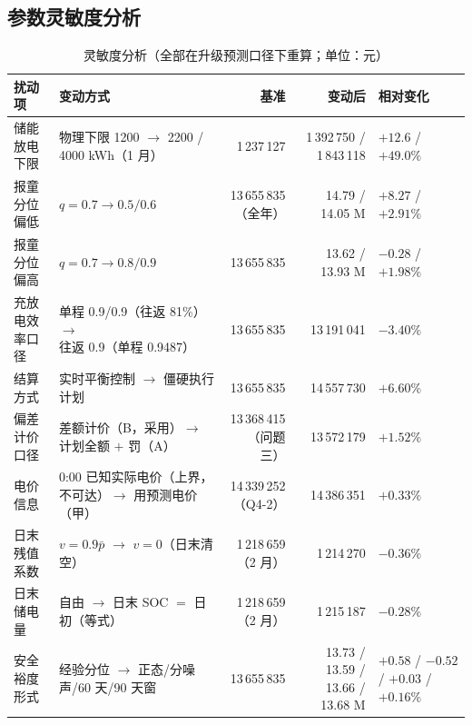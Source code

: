 \subsection{参数灵敏度分析}

\begin{table}[htbp]
\centering
\caption{灵敏度分析（全部在升级预测口径下重算\nobreak；单位\nobreak：元\nobreak）}
\label{tab:sens}
\begin{tabularx}{\textwidth}{@{}p{2.3cm}p{2.9cm}rRL@{}}
\toprule
扰动项 & 变动方式 & 基准 & 变动后 & 相对变化 \\
\midrule
储能放电下限 & 物理下限 1200 $\to$ 2200 / 4000 kWh（1 月\nobreak） & 1\,237\,127 & 1\,392\,750 / 1\,843\,118 & $+12.6$ / $+49.0\text{\%}$ \\
报童分位偏低 & $q=0.7\to0.5/0.6$ & 13\,655\,835（全年\nobreak） & 14.79 / 14.05 M & $+8.27$ / $+2.91\text{\%}$ \\
报童分位偏高 & $q=0.7\to0.8/0.9$ & 13\,655\,835 & 13.62 / 13.93 M & $-0.28$ / $+1.98\text{\%}$ \\
充放电效率口径 & 单程 0.9/0.9（往返 81\%\nobreak）$\to$ 往返 0.9（单程 0.9487\nobreak） & 13\,655\,835 & 13\,191\,041 & $-3.40\text{\%}$ \\
结算方式 & 实时平衡控制 $\to$ 僵硬执行计划 & 13\,655\,835 & 14\,557\,730 & $+6.60\text{\%}$ \\
偏差计价口径 & 差额计价（B\nobreak，采用\nobreak）$\to$ 计划全额 $+$ 罚（A\nobreak） & 13\,368\,415（问题三\nobreak） & 13\,572\,179 & $+1.52\text{\%}$ \\
电价信息 & 0:00 已知实际电价（上界\nobreak，不可达\nobreak）$\to$ 用预测电价（甲\nobreak） & 14\,339\,252（Q4-2\nobreak） & 14\,386\,351 & $+0.33\text{\%}$ \\
日末残值系数 & $v=0.9\bar p$ $\to$ $v=0$（日末清空\nobreak） & 1\,218\,659（2 月\nobreak） & 1\,214\,270 & $-0.36\text{\%}$ \\
日末储电量 & 自由 $\to$ 日末 SOC $=$ 日初（等式\nobreak） & 1\,218\,659（2 月\nobreak） & 1\,215\,187 & $-0.28\text{\%}$ \\
安全裕度形式 & 经验分位 $\to$ 正态/分噪声/60 天/90 天窗 & 13\,655\,835 & 13.73 / 13.59 / 13.66 / 13.68 M & $+0.58$ / $-0.52$ / $+0.03$ / $+0.16\text{\%}$ \\
\bottomrule
\end{tabularx}
\end{table}

